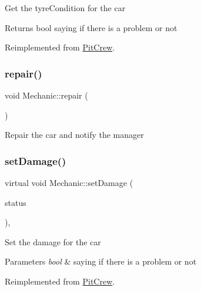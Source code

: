 Get the tyre\+Condition for the car \begin{DoxyReturn}{Returns}
bool saying if there is a problem or not 
\end{DoxyReturn}


Reimplemented from \mbox{\hyperlink{class_pit_crew_a7a527a6b4eccb6570dcad04b04dc1177}{Pit\+Crew}}.

\mbox{\label{class_mechanic_a4a7db79a24606239ab4c712a9d743d35}} 
\subsubsection{\texorpdfstring{repair()}{repair()}}
{\footnotesize\ttfamily void Mechanic\+::repair (\begin{DoxyParamCaption}{ }\end{DoxyParamCaption})\hspace{0.3cm}{\ttfamily [inline]}}

Repair the car and notify the manager \mbox{\label{class_mechanic_a12dfbe444cfcd09925534e2651ef5489}} 
\subsubsection{\texorpdfstring{set\+Damage()}{setDamage()}}
{\footnotesize\ttfamily virtual void Mechanic\+::set\+Damage (\begin{DoxyParamCaption}\item[{bool}]{status }\end{DoxyParamCaption})\hspace{0.3cm}{\ttfamily [inline]}, {\ttfamily [virtual]}}

Set the damage for the car 
\begin{DoxyParams}{Parameters}
{\em bool} & saying if there is a problem or not \\
\hline
\end{DoxyParams}


Reimplemented from \mbox{\hyperlink{class_pit_crew_a41051dd7081efeac022cc3a35a592c64}{Pit\+Crew}}.

\mbox{\label{class_mechanic_aadcc0312af851bd03361aec4744881ee}} 
